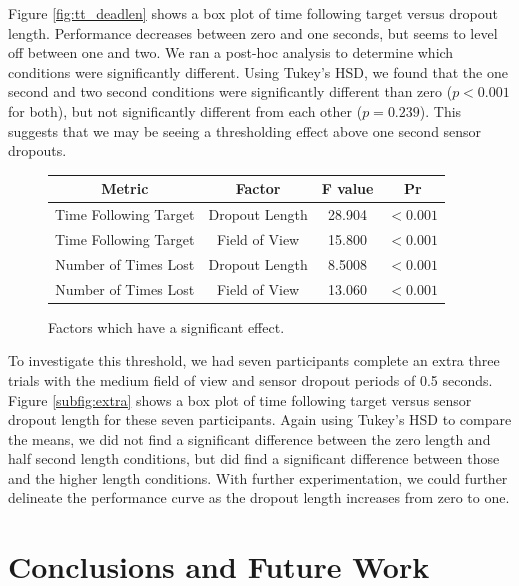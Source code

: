 \documentclass{acmsiggraph}                     %
\begin{document}
Figure \ref{fig:tt_deadlen} shows a box plot of time following target versus dropout length.  Performance decreases between zero and one seconds, but seems to level off between one and two.  We ran a post-hoc analysis to determine which conditions were significantly different.  Using Tukey's HSD, we found that the one second and two second conditions were significantly different than zero ($p<0.001$ for both), but not significantly different from each other ($p=0.239$).  This suggests that we may be seeing a thresholding effect above one second sensor dropouts.

\begin{figure}[h]
\centering
\begin{tabular}{|c|c|c|c|}
\hline
Metric & Factor & F value & Pr \\
\hline
Time Following Target & Dropout Length & 28.904 & $<0.001$\\
Time Following Target & Field of View & 15.800 & $<0.001$\\
Number of Times Lost & Dropout Length & 8.5008 & $<0.001$\\
Number of Times Lost & Field of View & 13.060 & $<0.001$\\
\hline
\end{tabular}
 \caption{\label{fig:anova}Factors which have a significant effect.}
\end{figure}

To investigate this threshold, we had seven participants complete an extra three trials with the medium field of view and sensor dropout periods of 0.5 seconds.  Figure \ref{subfig:extra} shows a box plot of time following target versus sensor dropout length for these seven participants.  Again using Tukey's HSD to compare the means, we did not find a significant difference between the zero length and half second length conditions, but did find a significant difference between those and the higher length conditions.
With further experimentation, we could further delineate the performance curve as the dropout length increases from zero to one.


\section{Conclusions and Future Work}
\end{document}
